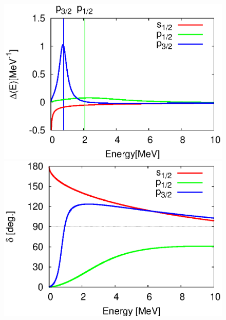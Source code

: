 \documentclass[english,a4paper]{jsarticle}
\begin{document}
\begin{figure}
  \begin{minipage}{0.5\textwidth}
    \begin{flushright}
      \includegraphics[width=1.0\textwidth,clip]{../cld/cld_sp.eps}
    \end{flushright}
  \end{minipage}
  \begin{minipage}{0.5\textwidth}
    \begin{flushright}
      \includegraphics[width=1.0\textwidth,clip]{../phs/phs_ana_sp.eps}
    \end{flushright}
  \end{minipage}
\end{figure}
\end{document}
